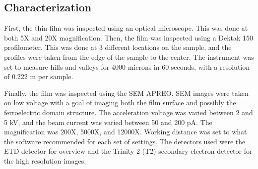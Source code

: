 \subsection{Characterization}

\noindent First, the thin film was inspected using an optical microscope. 
This was done at both 5X and 20X magnification.
Then, the film was inspected using a Dektak 150 profilometer.
This was done at 3 different locations on the sample, and the profiles were taken from the edge of the sample to the center.
The instrument was set to measure hills and valleys for 4000 microns in 60 seconds, with a resolution of 0.222 \textmu m per sample.

Finally, the film was inspected using the SEM APREO.
SEM images were taken on low voltage with a goal of imaging both the film surface and possibly the ferroelectric domain structure.
The acceleration voltage was varied between 2 and 5 kV, and the beam current was varied between 50 and 200 pA.
The magnification was 200X, 5000X, and 12000X. 
Working distance was set to what the software recommended for each set of settings.
The detectors used were the ETD detector for overview and the Trinity 2 (T2) secondary electron detector for the high resolution images.